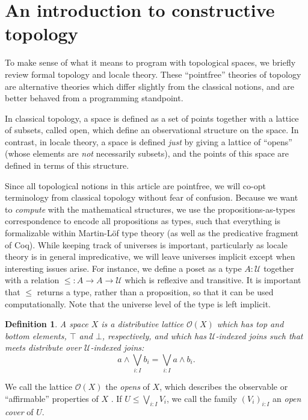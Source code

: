 \documentclass[conference]{IEEEtran}
\newtheorem{definition}{Definition}
\newcommand{\Type}{\mathcal{U}}
\newcommand{\Open}[1]{\mathcal{O}({#1})}
\begin{document}
\section{An introduction to constructive topology}

To make sense of what it means to program with topological spaces, we briefly review formal topology and locale theory. These ``pointfree'' theories of topology are alternative theories which differ slightly from the classical notions, and are better behaved from a programming standpoint.

In classical topology, a space is defined as a set of points together with a lattice of subsets, called open, which define an observational structure on the space. In contrast, in locale theory, a space is defined \emph{just} by giving a lattice of ``opens'' (whose elements are \emph{not} necessarily subsets), and the points of this space are defined in terms of this structure.

Since all topological notions in this article are pointfree, we will co-opt terminology from classical topology without fear of confusion. Because we want to \emph{compute} with the mathematical structures, we use the propositions-as-types correspondence to encode all propositions as types, such that everything is formalizable within Martin-L\"of type theory (as well as the predicative fragment of Coq). While keeping track of universes is important, particularly as locale theory is in general impredicative, we will leave universes implicit except when interesting issues arise. For instance, we define a poset as a type $A : \Type$ together with a relation $\le : A \to A \to \Type$ which is reflexive and transitive. It is important that $\le$ returns a type, rather than a proposition, so that it can be used computationally. Note that the universe level of the type is left implicit.

\begin{definition}
A \emph{space} $X$ is a distributive lattice $\Open{X}$ which has top and bottom elements, $\top$ and $\bot$, respectively, and which has $\Type$-indexed joins such that meets distribute over $\Type$-indexed joins: 
\[
a \wedge \bigvee_{i : I} b_i = \bigvee_{i : I} a \wedge b_i.
\]
\end{definition}

We call the lattice $\Open{X}$ the \emph{opens} of $X$, which describes the observable or ``affirmable'' properties of $X$ \cite{topologyvialogic}. If $U \le \bigvee_{i : I} V_i$, we call the family $(V_i)_{i : I}$ an \emph{open cover} of $U$.
\end{document}
